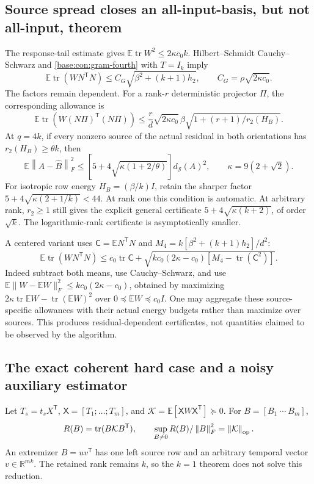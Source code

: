 \documentclass[11pt,oneside,openany,a4paper]{book}
\numberwithin{equation}{chapter}
\theoremstyle{definition}
\theoremstyle{remark}
\newcommand{\R}{\mathbb R}\newcommand{\E}{\mathbb E}\newcommand{\Prb}{\mathbb P}\newcommand{\PP}{\mathbb P}
\newcommand{\T}{\mathsf T}\newcommand{\Id}{I}
\newcommand{\F}[1]{\left\lVert#1\right\rVert_F}
\newcommand{\op}[1]{\left\lVert#1\right\rVert_{\rm op}}
\DeclareMathOperator{\tr}{tr}\DeclareMathOperator{\rank}{rank}
\newcommand{\Cov}{\mathsf C}\newcommand{\Loss}{\mathsf L}\newcommand{\Fil}{\mathcal F}
\begin{document}
\subsection{Source spread closes an all-input-basis, but not all-input, theorem}
The response-tail estimate gives
$\E\tr W^2\le2\kappa c_0k$. Hilbert--Schmidt Cauchy--Schwarz and \eqref{base:con:gram-fourth} with $T=I_k$ imply
\begin{equation}\label{base:con:gram-risk}
 \E\tr(WN^\T N)
 \le C_G\sqrt{\beta^2+(k+1)h_2},
 \qquad C_G=\rho\sqrt{2\kappa c_0}.
\end{equation}
The factors remain dependent. For a rank-$r$ deterministic projector $\Pi$, the corresponding allowance is
\[
 \E\tr(W(N\Pi)^\T(N\Pi))
 \le\frac r d\sqrt{2\kappa c_0}\,
 \beta\sqrt{1+(r+1)/r_2(H_B)}.
\]
At $q=4k$, if every nonzero source of the actual residual in both orientations has $r_2(H_B)\ge\theta k$, then
\begin{equation}\label{base:con:spread-global}
 \E\F{A-\widehat B}^2
 \le[5+4\sqrt{\kappa(1+2/\theta)}]d_{\mathcal S}(A)^2,
 \qquad\kappa=9(2+\sqrt2).
\end{equation}
For isotropic row energy $H_B=(\beta/k)I$, retain the sharper factor
$5+4\sqrt{\kappa(2+1/k)}<44$. At rank one this condition is automatic. At arbitrary rank, $r_2\ge1$ still gives the explicit general certificate
$5+4\sqrt{\kappa(k+2)}$, of order $\sqrt k$. The logarithmic-rank certificate is asymptotically smaller.

A centered variant uses $\Cov=\E N^\T N$ and
$M_4=k[\beta^2+(k+1)h_2]/d^2$:
\begin{equation}\label{base:con:centered-risk}
 \E\tr(WN^\T N)\le c_0\tr\Cov+
 \sqrt{k c_0(2\kappa-c_0)[M_4-\tr(\Cov^2)]}.
\end{equation}
Indeed subtract both means, use Cauchy--Schwarz, and use
$\E\|W-\E W\|_F^2\le k c_0(2\kappa-c_0)$, obtained by maximizing
$2\kappa\tr\E W-\tr(\E W)^2$ over $0\preceq\E W\preceq c_0I$.
One may aggregate these source-specific allowances with their actual energy budgets rather than maximize over sources. This produces residual-dependent certificates, not quantities claimed to be observed by the algorithm.

\subsection{The exact coherent hard case and a noisy auxiliary estimator}
Let $T_s=t_sX^\T$, $\mathsf X=[T_1;\ldots;T_m]$, and
$\mathcal K=\E[\mathsf XW\mathsf X^\T]\succeq0$. For $B=[B_1\ \cdots\ B_m]$,
\[
 R(B)=\tr(B\mathcal K B^\T),\qquad
 \sup_{B\ne0}R(B)/\F B^2=\op{\mathcal K}.
\]
An extremizer $B=uv^\T$ has one left source row and an arbitrary temporal vector $v\in\R^{mk}$. The retained rank remains $k$, so the $k=1$ theorem does not solve this reduction.
\end{document}
